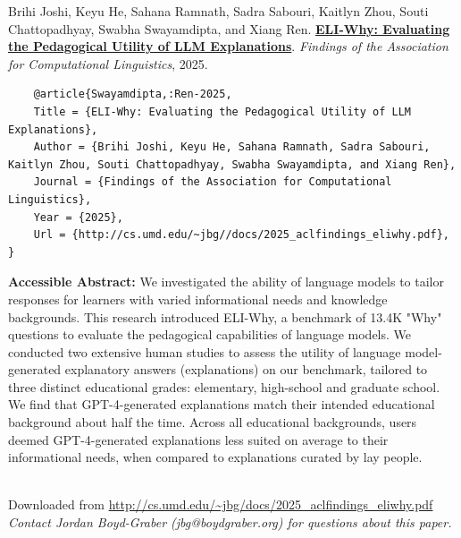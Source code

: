 \documentclass[a4paper]{article}
\begin{document}
    Brihi Joshi, Keyu He, Sahana Ramnath, Sadra Sabouri, Kaitlyn Zhou, Souti Chattopadhyay, Swabha Swayamdipta, and Xiang Ren.  {\bf \href{http://cs.umd.edu/~jbg//docs/2025_aclfindings_eliwhy.pdf}{ELI-Why: Evaluating the Pedagogical Utility of LLM Explanations}}.  \emph{Findings of the Association for Computational Linguistics}, 2025.



    \vspace{5cm}

    \begin{verbatim}
    @article{Swayamdipta,:Ren-2025,
	Title = {ELI-Why: Evaluating the Pedagogical Utility of LLM Explanations},
	Author = {Brihi Joshi, Keyu He, Sahana Ramnath, Sadra Sabouri, Kaitlyn Zhou, Souti Chattopadhyay, Swabha Swayamdipta, and Xiang Ren},
	Journal = {Findings of the Association for Computational Linguistics},
	Year = {2025},
	Url = {http://cs.umd.edu/~jbg//docs/2025_aclfindings_eliwhy.pdf},
}

    \end{verbatim}

    {\bf Accessible Abstract:} We investigated the ability of language models to tailor responses for learners with varied informational needs and knowledge backgrounds. This research introduced ELI-Why, a benchmark of 13.4K "Why" questions to evaluate the pedagogical capabilities of language models. We conducted two extensive human studies to assess the utility of language model-generated explanatory answers (explanations) on our benchmark, tailored to three distinct educational grades: elementary, high-school and graduate school. We find that GPT-4-generated explanations match their intended educational background about half the time. Across all educational backgrounds, users deemed GPT-4-generated explanations less suited on average to their informational needs, when compared to explanations curated by lay people.\\~

    

    

    \vspace{3cm}
    Downloaded from \url{http://cs.umd.edu/~jbg/docs/2025_aclfindings_eliwhy.pdf}  \\

    \vspace{2cm}
    \textit{Contact Jordan Boyd-Graber (jbg@boydgraber.org) for questions about this paper.}

    

    
\end{document}
